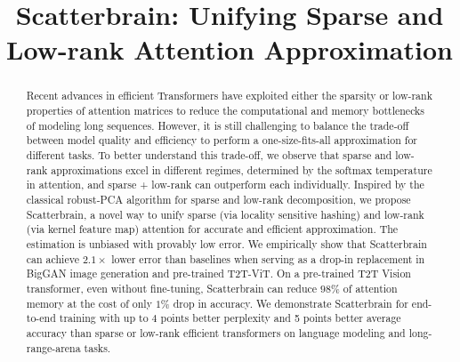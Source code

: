 \title{Scatterbrain: Unifying Sparse and Low-rank Attention Approximation}

\begin{abstract}
Recent advances in efficient Transformers have exploited either the sparsity or low-rank properties of attention matrices to reduce the computational and memory bottlenecks of modeling long sequences. However, it is still challenging to balance the trade-off between model quality and efficiency to perform a one-size-fits-all approximation for different tasks. To better understand this trade-off, we observe that sparse and low-rank approximations excel in different regimes, determined by the softmax temperature in attention, and sparse + low-rank can outperform each individually. Inspired by the classical robust-PCA algorithm for sparse and low-rank decomposition, we propose Scatterbrain, a novel way to unify sparse (via locality sensitive hashing) and low-rank (via kernel feature map) attention for accurate and efficient approximation. The estimation is unbiased with provably low error. We empirically show that Scatterbrain can achieve $2.1 \times$ lower error than baselines when serving as a drop-in replacement in BigGAN image generation and pre-trained T2T-ViT. On a pre-trained T2T Vision transformer, even without fine-tuning, Scatterbrain can reduce $98\%$ of attention memory at the cost of only $1\%$ drop in accuracy. We demonstrate Scatterbrain for end-to-end training with up to $4$ points better perplexity and 5 points better average accuracy than sparse or low-rank efficient transformers on language modeling and long-range-arena tasks.
\end{abstract}



